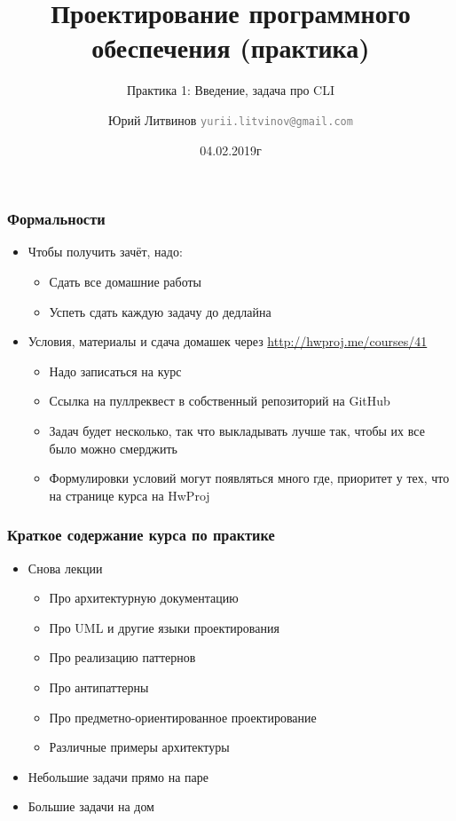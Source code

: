 \documentclass[xetex,mathserif,serif]{beamer}
\title{Проектирование программного обеспечения (практика)}
\subtitle{Практика 1: Введение, задача про CLI}
\author[Юрий Литвинов]{Юрий Литвинов \newline \textcolor{gray}{\small\texttt{yurii.litvinov@gmail.com}}}
\date{04.02.2019г}
\begin{document}
	
	\frame{\titlepage}
	
	\begin{frame}
		\frametitle{Формальности}
		\begin{itemize}
			\item Чтобы получить зачёт, надо:
			\begin{itemize}
				\item Сдать все домашние работы
				\item Успеть сдать каждую задачу до дедлайна
			\end{itemize}
			\item Условия, материалы и сдача домашек через \url{http://hwproj.me/courses/41}
			\begin{itemize}
				\item Надо записаться на курс
			\end{itemize}
			\begin{itemize}
				\item Ссылка на пуллреквест в собственный репозиторий на GitHub
				\item Задач будет несколько, так что выкладывать лучше так, чтобы их все было можно смерджить
				\item Формулировки условий могут появляться много где, приоритет у тех, что на странице курса на HwProj
			\end{itemize}
		\end{itemize}
	\end{frame}

	\begin{frame}
		\frametitle{Краткое содержание курса по практике}
		\begin{itemize}
			\item Снова лекции
			\begin{itemize}
				\item Про архитектурную документацию
				\item Про UML и другие языки проектирования
				\item Про реализацию паттернов
				\item Про антипаттерны
				\item Про предметно-ориентированное проектирование
				\item Различные примеры архитектуры
			\end{itemize}
			\item Небольшие задачи прямо на паре
			\item Большие задачи на дом
		\end{itemize}
	\end{frame}
	
\end{document}
